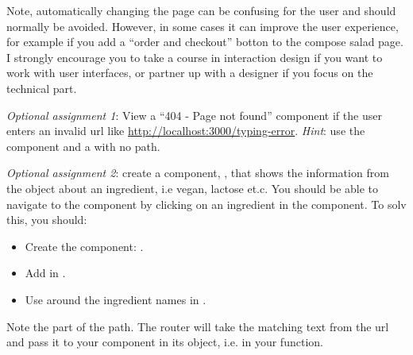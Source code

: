 \documentclass[fleqn, article, a4paper]{memoir}
\begin{document}
\begin{Assignments}
Note, automatically changing the page can be confusing for the user and should normally be avoided. However, in some cases it can improve the user experience, for example if you add a ``order and checkout'' botton to the compose salad page. I strongly encourage you to take a course in interaction design if you want to work with user interfaces, or partner up with a designer if you focus on the technical part.

\item \emph{Optional assignment 1}: View a ``404 - Page not found'' component if the user enters an invalid url like \url{http://localhost:3000/typing-error}. \emph{Hint}: use the  component and a  with no path.

\item \emph{Optional assignment 2}: create a component, , that shows the information from the  object about an ingredient, i.e vegan, lactose et.c. You should be able to navigate to the  component by clicking on an ingredient in the  component. To solv this, you should:

\begin{itemize}
  \item Create the component: .
  \item Add  in .
  \item Use  around the ingredient names in .
\end{itemize}
Note the  part of the path. The router will take the matching text from the url and pass it to your component in its  object, i.e.  in your  function.


\end{Assignments}
\end{document}
